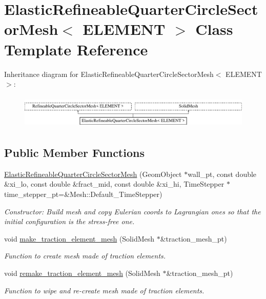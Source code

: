 \hypertarget{classElasticRefineableQuarterCircleSectorMesh}{}\section{Elastic\+Refineable\+Quarter\+Circle\+Sector\+Mesh$<$ E\+L\+E\+M\+E\+NT $>$ Class Template Reference}
\label{classElasticRefineableQuarterCircleSectorMesh}
Inheritance diagram for Elastic\+Refineable\+Quarter\+Circle\+Sector\+Mesh$<$ E\+L\+E\+M\+E\+NT $>$\+:\begin{figure}[H]
\begin{center}
\leavevmode
\includegraphics[height=1.623188cm]{classElasticRefineableQuarterCircleSectorMesh}
\end{center}
\end{figure}
\subsection*{Public Member Functions}
\begin{DoxyCompactItemize}
\item 
\hyperlink{classElasticRefineableQuarterCircleSectorMesh_a123699deecd2a908a7a882a9d2a9f4dd}{Elastic\+Refineable\+Quarter\+Circle\+Sector\+Mesh} (Geom\+Object $\ast$wall\+\_\+pt, const double \&xi\+\_\+lo, const double \&fract\+\_\+mid, const double \&xi\+\_\+hi, Time\+Stepper $\ast$time\+\_\+stepper\+\_\+pt=\&Mesh\+::\+Default\+\_\+\+Time\+Stepper)
\begin{DoxyCompactList}\small\item\em Constructor\+: Build mesh and copy Eulerian coords to Lagrangian ones so that the initial configuration is the stress-\/free one. \end{DoxyCompactList}\item 
void \hyperlink{classElasticRefineableQuarterCircleSectorMesh_ad9734ea7aee2141079544bb782d3ace1}{make\+\_\+traction\+\_\+element\+\_\+mesh} (Solid\+Mesh $\ast$\&traction\+\_\+mesh\+\_\+pt)
\begin{DoxyCompactList}\small\item\em Function to create mesh made of traction elements. \end{DoxyCompactList}\item 
void \hyperlink{classElasticRefineableQuarterCircleSectorMesh_a33ef5828fc64fcf4e50e6c38d626ffcb}{remake\+\_\+traction\+\_\+element\+\_\+mesh} (Solid\+Mesh $\ast$\&traction\+\_\+mesh\+\_\+pt)
\begin{DoxyCompactList}\small\item\em Function to wipe and re-\/create mesh made of traction elements. \end{DoxyCompactList}\end{DoxyCompactItemize}


